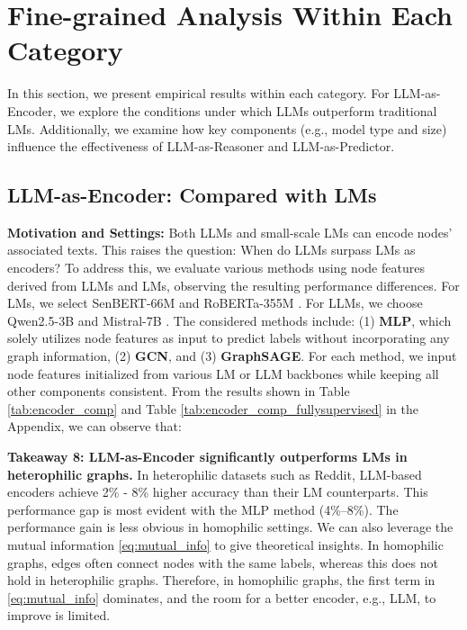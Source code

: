 \section{Fine-grained Analysis Within Each Category}
In this section, we present empirical results within each category. For LLM-as-Encoder, we explore the conditions under which LLMs outperform traditional LMs. Additionally, we examine how key components (e.g., model type and size) influence the effectiveness of LLM-as-Reasoner and LLM-as-Predictor. 

\subsection{LLM-as-Encoder: Compared with LMs}\label{exp:encoder_comp}



\textbf{Motivation and Settings: }Both LLMs and small-scale LMs can encode nodes' associated texts. This raises the question: When do LLMs surpass LMs as encoders? To address this, we evaluate various methods using node features derived from LLMs and LMs, observing the resulting performance differences. For LMs, we select SenBERT-66M \cite{reimers-2019-sentence-bert} and RoBERTa-355M \cite{Liu2019roberta}. For LLMs, we choose Qwen2.5-3B \cite{Yang2024Qwen2TR} and Mistral-7B \cite{Jiang2023Mistral7B}. The considered methods include: (1) \textbf{MLP}, which solely utilizes node features as input to predict labels without incorporating any graph information, (2) \textbf{GCN}, and (3) \textbf{GraphSAGE}. For each method, we input node features initialized from various LM or LLM backbones while keeping all other components consistent.  From the results shown in Table \ref{tab:encoder_comp} and Table \ref{tab:encoder_comp_fullysupervised} in the Appendix, we can observe that: 


\textbf{Takeaway 8: LLM-as-Encoder significantly outperforms LMs in heterophilic graphs.} In heterophilic datasets such as Reddit, LLM-based encoders achieve 2\% - 8\% higher accuracy than their LM counterparts. This performance gap is most evident with the MLP method (4\%–8\%). The performance gain is less obvious in homophilic settings. We can also leverage the mutual information \eqref{eq:mutual_info} to give theoretical insights. In homophilic graphs, edges often connect nodes with the same labels, whereas this does not hold in heterophilic graphs. Therefore, in homophilic graphs, the first term in \eqref{eq:mutual_info} dominates, and the room for a better encoder, e.g., LLM, to improve is limited. 


